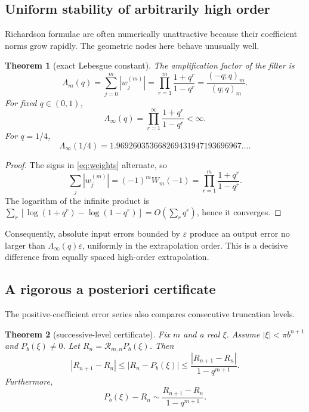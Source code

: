 \documentclass[11pt]{article}
\newtheorem{theorem}{Theorem}[section]
\theoremstyle{definition}
\theoremstyle{remark}
\newcommand{\abs}[1]{\left\lvert #1\right\rvert}
\begin{document}
\subsection{Uniform stability of arbitrarily high order}

Richardson formulae are often numerically unattractive because their coefficient
norms grow rapidly. The geometric nodes here behave unusually well.

\begin{theorem}[exact Lebesgue constant]
\label{thm:stability}
The amplification factor of the filter is
\begin{equation}
 \Lambda_m(q)=\sum_{j=0}^m\abs{w_j^{(m)}}
 =\prod_{r=1}^m\frac{1+q^r}{1-q^r}
 =\frac{(-q;q)_m}{(q;q)_m}.
 \label{eq:Lebesgue}
\end{equation}
For fixed \(q\in(0,1)\),
\begin{equation}
 \Lambda_\infty(q)=\prod_{r=1}^{\infty}\frac{1+q^r}{1-q^r}<\infty.
 \label{eq:LebesgueInf}
\end{equation}
For \(q=1/4\),
\begin{equation}
 \Lambda_\infty(1/4)
 =1.969260353668269431947193696967\ldots.
 \label{eq:LambdaQuarter}
\end{equation}
\end{theorem}

\begin{proof}
The signs in \eqref{eq:weights} alternate, so
\[
 \sum_j\abs{w_j^{(m)}}=(-1)^mW_m(-1)
 =\prod_{r=1}^m\frac{1+q^r}{1-q^r}.
\]
The logarithm of the infinite product is
\(\sum_r[\log(1+q^r)-\log(1-q^r)]=O(\sum_rq^r)\), hence it converges.
\end{proof}

Consequently, absolute input errors bounded by \(\varepsilon\) produce an output
error no larger than \(\Lambda_\infty(q)\varepsilon\), uniformly in the
extrapolation order. This is a decisive difference from equally spaced
high-order extrapolation.

\subsection{A rigorous a posteriori certificate}

The positive-coefficient error series also compares consecutive truncation
levels.

\begin{theorem}[successive-level certificate]
\label{thm:certificate}
Fix \(m\) and a real \(\xi\). Assume
\(\abs\xi<\pi b^{n+1}\) and \(P_b(\xi)\ne0\). Let
\(R_n=\mathcal R_{m,n}P_b(\xi)\). Then
\begin{equation}
 \abs{R_{n+1}-R_n}
 \leq \abs{R_n-P_b(\xi)}
 \leq \frac{\abs{R_{n+1}-R_n}}{1-q^{m+1}}.
 \label{eq:certificate}
\end{equation}
Furthermore,
\begin{equation}
 P_b(\xi)-R_n
 \sim \frac{R_{n+1}-R_n}{1-q^{m+1}}.
 \label{eq:asympest}
\end{equation}
\end{theorem}
\end{document}
